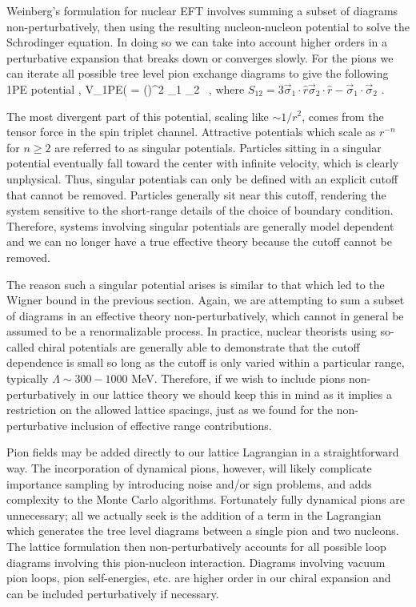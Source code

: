 Weinberg's formulation for nuclear EFT involves summing a subset of diagrams non-perturbatively, then using the resulting nucleon-nucleon potential to solve the Schrodinger equation. In doing so we can take into account higher orders in a perturbative expansion that  breaks down or converges slowly. For the pions we can iterate all possible tree level pion exchange diagrams to give the following 1PE potential \cite{Epelbaum:2010nr},
\beq
V_{\mbox{\tiny 1PE}}( = \left(\right)^2 \vec{\tau}_1 \cdot \vec{\tau}_2  \ , \cr
\eeq
where $S_{12} = 3\vec{\sigma}_1 \cdot \hat{r} \vec{\sigma}_2 \cdot \hat{r} - \vec{\sigma}_1 \cdot \vec{\sigma}_2$ . 

The most divergent part of this potential, scaling like $\sim 1/r^2$, comes from the tensor force in the spin triplet channel. Attractive potentials which scale as $r^{-n}$ for $n \geq 2$ are referred to as singular potentials. Particles sitting in a singular potential eventually fall toward the center with infinite velocity, which is clearly unphysical. Thus, singular potentials can only be defined with an explicit cutoff that cannot be removed. Particles generally sit near this cutoff, rendering the system sensitive to the short-range details of the choice of boundary condition. Therefore, systems involving singular potentials are generally model dependent and we can no longer have a true effective theory because the cutoff cannot be removed. 

The reason such a singular potential arises is similar to that which led to the Wigner bound in the previous section. Again, we are attempting to sum a subset of diagrams in an effective theory non-perturbatively, which cannot in general be assumed to be a renormalizable process. In practice, nuclear theorists using so-called chiral potentials are generally able to demonstrate that the cutoff dependence is small so long as the cutoff is only varied within a particular range, typically $\Lambda \sim 300-1000$ MeV. Therefore, if we wish to include pions non-perturbatively in our lattice theory we should keep this in mind as it implies a restriction on the allowed lattice spacings, just as we found for the non-perturbative inclusion of effective range contributions. 

Pion fields may be added directly to our lattice Lagrangian in a straightforward way. The incorporation of dynamical pions, however, will likely complicate importance sampling by introducing noise and/or sign problems, and adds complexity to the Monte Carlo algorithms. Fortunately fully dynamical pions are unnecessary; all we actually seek is the addition of a term in the Lagrangian which generates the tree level diagrams between a single pion and two nucleons. The lattice formulation then non-perturbatively accounts for all possible loop diagrams involving this pion-nucleon interaction. Diagrams involving vacuum pion loops, pion self-energies, etc. are higher order in our chiral expansion and can be included perturbatively if necessary. 

